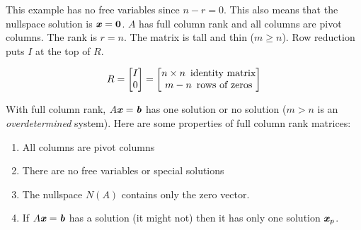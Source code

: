 \documentclass[12pt, letterpaper]{article}
\newcommand{\V}[1]{\textbf{\textit{#1}}}
\theoremstyle{definition}
\begin{document}
		This example has no free variables since $n-r=0$. This also means that the nullspace solution is $\V{x} = \textbf{0}$. $A$ has full column rank and all columns are pivot columns. The rank is $r=n$. The matrix is tall and thin ($m \ge n$). Row reduction puts $I$ at the top of $R$.
		
			$$R = \begin{bmatrix}
					I \\ 0
				\end{bmatrix} = \begin{bmatrix}
									n \times n \text{ \,identity matrix}\\m - n \text{ \,rows of zeros}
									\end{bmatrix}$$
	
	\noindent With full column rank, $A\V{x} = \V{b}$ has one solution or no solution ($m>n$ is an \textit{overdetermined} system). Here are some properties of full column rank matrices: 
		\begin{enumerate}
			\item All columns are pivot columns
			\item There are no free variables or special solutions
			\item The nullspace $N(A)$ contains only the zero vector.
			\item If $A\V{x} = \V{b}$ has a solution (it might not) then it has only one solution $\V{x}_p$.
		\end{enumerate}
	
\end{document}
